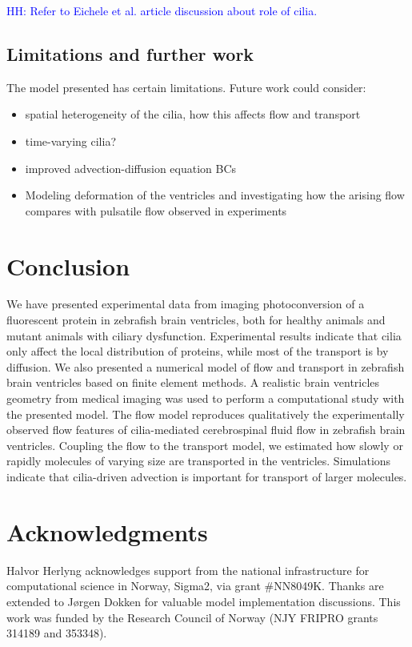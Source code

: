 \documentclass[fleqn]{wlscirep}
\newcommand{\lyng}[1]{\textcolor{blue}{#1}}
\begin{document}
\lyng{HH: Refer to Eichele et al. article discussion about role of cilia.}


\subsection*{Limitations and further work}
The model presented has certain limitations. Future work could consider:
\begin{itemize}
    \item spatial heterogeneity of the cilia, how this affects flow and transport
    \item time-varying cilia?
    \item improved advection-diffusion equation BCs
    \item Modeling deformation of the ventricles and investigating how the arising flow compares with pulsatile flow observed in experiments
\end{itemize}

\section*{Conclusion}
We have presented experimental data from imaging photoconversion of a fluorescent protein in zebrafish brain ventricles, both for healthy animals and mutant animals with ciliary dysfunction. Experimental results indicate that cilia only affect the local distribution of proteins, while most of the transport is by diffusion. We also presented a numerical model of flow and transport in zebrafish brain ventricles based on finite element methods. A realistic brain ventricles geometry from medical imaging was used to perform a computational study with the presented model. The flow model reproduces qualitatively the experimentally observed flow features of cilia-mediated cerebrospinal fluid flow in zebrafish brain ventricles. Coupling the flow to the transport model, we estimated how slowly or rapidly molecules of varying size are transported in the ventricles. Simulations indicate that cilia-driven advection is important for transport of larger molecules.


\section*{Acknowledgments}
Halvor Herlyng acknowledges support from the national infrastructure for computational
science in Norway, Sigma2, via grant \#NN8049K. Thanks are extended to J\o rgen Dokken
for valuable model implementation discussions.
This work was funded by the Research Council of Norway (NJY FRIPRO grants 314189 and 353348).
\newpage
\end{document}
